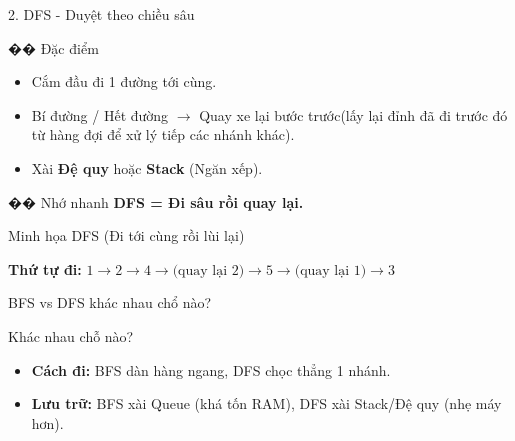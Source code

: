 \documentclass[11pt]{beamer}
\begin{document}
\begin{frame}{2. DFS - Duyệt theo chiều sâu}
    \begin{block}{�� Đặc điểm}
        \begin{itemize}
            \item Cắm đầu đi 1 đường tới cùng.
            \item Bí đường / Hết đường $\rightarrow$ Quay xe lại bước trước(lấy lại đỉnh đã đi trước đó từ hàng đợi để xử lý tiếp các nhánh khác).
            \item Xài \textbf{Đệ quy} hoặc \textbf{Stack} (Ngăn xếp).
        \end{itemize}
    \end{block}
    
    \begin{exampleblock}{�� Nhớ nhanh}
        \textbf{DFS = Đi sâu rồi quay lại.}
    \end{exampleblock}
\end{frame}

\begin{frame}{Minh họa DFS (Đi tới cùng rồi lùi lại)}
    \begin{center}
    \end{center}
    \begin{exampleblock}{}
        \centering \textbf{Thứ tự đi:} $1 \rightarrow 2 \rightarrow 4 \rightarrow \text{(quay lại 2)} \rightarrow 5 \rightarrow \text{(quay lại 1)} \rightarrow 3$
    \end{exampleblock}
\end{frame}

\begin{frame}{ BFS vs DFS khác nhau chổ nào?}
    \begin{block}{Khác nhau chỗ nào?}
        \begin{itemize}
            \item \textbf{Cách đi:} BFS dàn hàng ngang, DFS chọc thẳng 1 nhánh.
            \item \textbf{Lưu trữ:} BFS xài Queue (khá tốn RAM), DFS xài Stack/Đệ quy (nhẹ máy hơn).
        \end{itemize}
    \end{block}
\end{frame}
\end{document}
